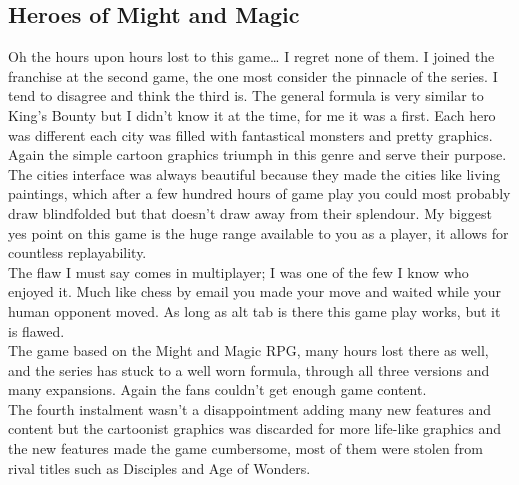 \documentclass[a4paper]{article}
\begin{document}
\subsection{Heroes of Might and Magic}
Oh the hours upon hours lost to this game… I regret none of them. I joined the franchise at the second game, the one most consider the pinnacle of the series. I tend to disagree and think the third is. The general formula is very similar to King's Bounty but I didn't know it at the time, for me it was a first. Each hero was different each city was filled with fantastical monsters and pretty graphics.\\
Again the simple cartoon graphics triumph in this genre and serve their purpose. The cities interface was always beautiful because they made the cities like living paintings, which after a few hundred hours of game play you could most probably draw blindfolded but that doesn't draw away from their splendour. My biggest yes point on this game is the huge range available to you as a player, it allows for countless replayability.\\
The flaw I must say comes in multiplayer; I was one of the few I know who enjoyed it. Much like chess by email you made your move and waited while your human opponent moved. As long as alt tab is there this game play works, but it is flawed.\\
The game based on the Might and Magic RPG, many hours lost there as well, and the series has stuck to a well worn formula, through all three versions and many expansions. Again the fans couldn't get enough game content.\\
The fourth instalment wasn't a disappointment adding many new features and content but the cartoonist graphics was discarded for more life-like graphics and the new features made the game cumbersome, most of them were stolen from rival titles such as Disciples and Age of Wonders.
\end{document}
